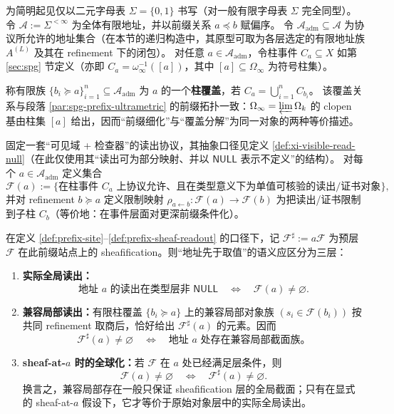 \begin{definition}[前缀站点与柱覆盖]\label{def:prefix-site}
为简明起见仅以二元字母表 \(\Sigma=\{0,1\}\) 书写（对一般有限字母表 \(\Sigma\) 完全同型）。令 \(\mathcal{A}:=\Sigma^{<\infty}\) 为全体有限地址，并以前缀关系 \(a\preceq b\) 赋偏序。
令 \(\mathcal{A}_{\mathrm{adm}}\subseteq\mathcal{A}\) 为协议所允许的地址集合（在本节的递归构造中，其原型可取为各层选定的有限地址族 \(A^{(L)}\) 及其在 refinement 下的闭包）。
对任意 \(a\in\mathcal{A}_{\mathrm{adm}}\)，令柱事件 \(C_a\subseteq X\) 如第 \ref{sec:spg} 节定义（亦即 \(C_a=\omega_\infty^{-1}([a])\)，其中 \([a]\subseteq\Omega_\infty\) 为符号柱集）。
\par
称有限族 \(\{b_i\succeq a\}_{i=1}^n\subseteq\mathcal{A}_{\mathrm{adm}}\) 为 \(a\) 的一个\textbf{柱覆盖}，若 \(C_a=\bigcup_{i=1}^{n} C_{b_i}\)。
该覆盖关系与段落 \ref{par:spg-prefix-ultrametric} 的前缀拓扑一致：\(\Omega_\infty=\varprojlim \Omega_k\) 的 clopen 基由柱集 \([a]\) 给出，因而“前缀细化”与“覆盖分解”为同一对象的两种等价描述。
\end{definition}

\begin{definition}[协议可接受读出的（预）层]\label{def:prefix-sheaf-readout}
固定一套“可见域 + 检查器”的读出协议，其抽象口径见定义 \ref{def:xi-visible-read-null}（在此仅使用其“读出可为部分映射、并以 \(\mathsf{NULL}\) 表示不定义”的结构）。
对每个 \(a\in\mathcal{A}_{\mathrm{adm}}\) 定义集合
\[
\mathscr{F}(a):=\{\text{在柱事件 }C_a\text{ 上协议允许、且在类型意义下为单值可核验的读出/证书对象}\},
\]
并对 refinement \(b\succeq a\) 定义限制映射
\(\rho_{a\leftarrow b}:\mathscr{F}(a)\to\mathscr{F}(b)\)
为把读出/证书限制到子柱 \(C_b\)（等价地：在事件层面对更深前缀条件化）。
\end{definition}

\begin{proposition}\label{prop:null-as-local-section-obstruction}
在定义 \ref{def:prefix-site}--\ref{def:prefix-sheaf-readout} 的口径下，记 \(\mathscr{F}^{\sharp}:=a\mathscr{F}\) 为预层 \(\mathscr{F}\) 在此前缀站点上的 sheafification。则“地址先于取值”的语义应区分为三层：
\begin{enumerate}
  \item \textbf{实际全局读出：}
  \[
  \text{地址 }a\text{ 的读出在类型层非 }\mathsf{NULL}
  \quad\Longleftrightarrow\quad
  \mathscr{F}(a)\neq\varnothing.
  \]
  \item \textbf{兼容局部读出：}有限柱覆盖 \(\{b_i\succeq a\}\) 上的兼容局部对象族 \((s_i\in\mathscr{F}(b_i))\) 按共同 refinement 取商后，恰好给出 \(\mathscr{F}^{\sharp}(a)\) 的元素。因而
  \[
  \mathscr{F}^{\sharp}(a)\neq\varnothing
  \quad\Longleftrightarrow\quad
  \text{地址 }a\text{ 处存在兼容局部截面族。}
  \]
  \item \textbf{sheaf-at-\(a\) 时的全球化：}若 \(\mathscr{F}\) 在 \(a\) 处已经满足层条件，则
  \[
  \mathscr{F}(a)\neq\varnothing
  \quad\Longleftrightarrow\quad
  \mathscr{F}^{\sharp}(a)\neq\varnothing.
  \]
  换言之，兼容局部存在一般只保证 sheafification 层的全局截面；只有在显式的 sheaf-at-\(a\) 假设下，它才等价于原始对象层中的实际全局读出。
\end{enumerate}
\end{proposition}

